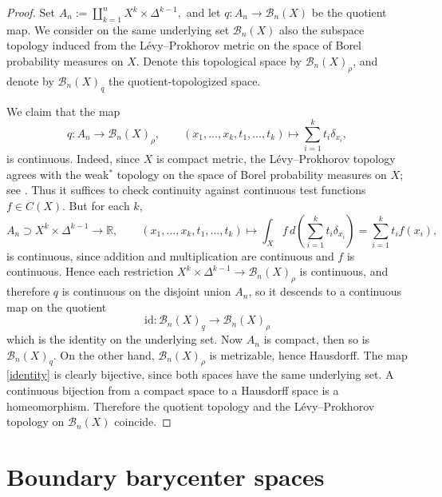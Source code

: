 \documentclass[11pt,a4paper]{article}
\numberwithin{equation}{section}
\theoremstyle{definition}
\theoremstyle{remark}
\newcommand{\BB}{\mathcal B}
\begin{document}
\begin{proof}
Set
$
A_n:=\coprod_{k=1}^n X^k\times \Delta^{k-1},
$
and let
$q:A_n\longrightarrow \BB_n(X)
$
be the quotient map.
We consider on the same underlying set \(\BB_n(X)\) also the subspace topology
induced from the Lévy--Prokhorov metric on the space of Borel probability
measures on \(X\). Denote this topological space by \(\BB_n(X)_{\rho}\), and denote
by \(\BB_n(X)_q\) the quotient-topologized space.

We claim that the map
\[
q:A_n\longrightarrow \BB_n(X)_{\rho},
\qquad
(x_1,\dots,x_k,t_1,\dots,t_k)\longmapsto \sum_{i=1}^k t_i\delta_{x_i},
\]
is continuous.
Indeed, since \(X\) is compact metric, the Lévy--Prokhorov topology agrees with
the weak\(^*\) topology on the space of Borel probability measures on \(X\); see \cite{Billingsley}.
Thus it suffices to check continuity against continuous test functions
\(f\in C(X)\). But for each \(k\),
\[
A_n \supset X^k\times \Delta^{k-1}\longrightarrow \mathbb R,
\qquad
(x_1,\dots,x_k,t_1,\dots,t_k)\longmapsto
\int_X f\, d\!\left(\sum_{i=1}^k t_i\delta_{x_i}\right)
=\sum_{i=1}^k t_i f(x_i),
\]
is continuous, since addition and multiplication are continuous and \(f\) is
continuous. Hence each restriction
$\displaystyle 
X^k\times \Delta^{k-1}\longrightarrow \BB_n(X)_{\rho}$
is continuous, and therefore \(q\) is continuous on the disjoint union \(A_n\), so it descends to a continuous map on the quotient
\begin{equation}\label{identity}
\mathrm{id}:\BB_n(X)_q\longrightarrow \BB_n(X)_{\rho}
\end{equation}
which is the identity on the underlying set.
Now \(A_n\) is compact, then so is \(\BB_n(X)_q\).
On the other hand, \(\BB_n(X)_{\rho}\) is metrizable, hence Hausdorff.
The map \eqref{identity}
is clearly bijective, since both spaces have the same underlying set. A continuous
bijection from a compact space to a Hausdorff space is a homeomorphism.
Therefore the quotient topology and the Lévy--Prokhorov topology on \(\BB_n(X)\)
coincide.
\end{proof}





\section{Boundary barycenter spaces}
\label{sec:def}
\end{document}
